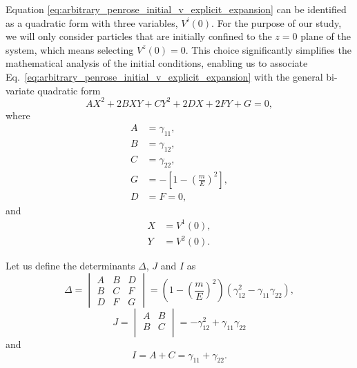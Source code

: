 Equation \eqref{eq:arbitrary_penrose_initial_v_explicit_expansion} can be identified as a quadratic form with three variables, $V^i(0)$. For the purpose of our study, we will only consider particles that are initially confined to the $z=0$ plane of the system, which means selecting $V^z(0) = 0$. This choice significantly simplifies the mathematical analysis of the initial conditions, enabling us to associate Eq.~\eqref{eq:arbitrary_penrose_initial_v_explicit_expansion} with the general bi-variate quadratic form
%
\begin{equation}
  A X^2 + 2 B X Y + C Y^2 + 2 D X + 2 F Y + G = 0,
  \label{eq:arbitrary_penrose_general_quadratic_form}
\end{equation}
%
where
%
\begin{align}
  A & = \gamma_{11},                                      \\
  B & = \gamma_{12},                                      \\
  C & = \gamma_{22},                                      \\
  G & = -\left[ 1 - \left( \frac{m}{E} \right)^2 \right], \\
  D & = F = 0,
\end{align}
%
and
%
\begin{align}
  X & = V^1(0),  \\
  Y & = V^2(0).
\end{align}

Let us define the determinants $\Delta$, $J$ and $I$ as
%
\begin{equation}
  \Delta = 
  \begin{vmatrix}
    A & B & D  \\
    B & C & F  \\
    D & F & G
  \end{vmatrix}
  = \left( 1 - \left( \frac{m}{E} \right)^2 \right) \left(\gamma_{12}^2-\gamma_{11} \gamma_{22}\right)
  \label{eq:arbitrary_penrose_quadratic_determinant}
  ,
\end{equation}
%
\begin{equation}
  J = 
  \begin{vmatrix}
    A & B \\
    B & C \\
  \end{vmatrix}
  = -\gamma_{12}^2 + \gamma_{11}\gamma_{22}
  \label{eq:arbitrary_penrose_quadratic_J}
\end{equation}
%
and
%
\begin{equation}
  I = A + C = \gamma_{11} + \gamma_{22}.
  \label{eq:arbitrary_penrose_quadratic_I}
\end{equation}

